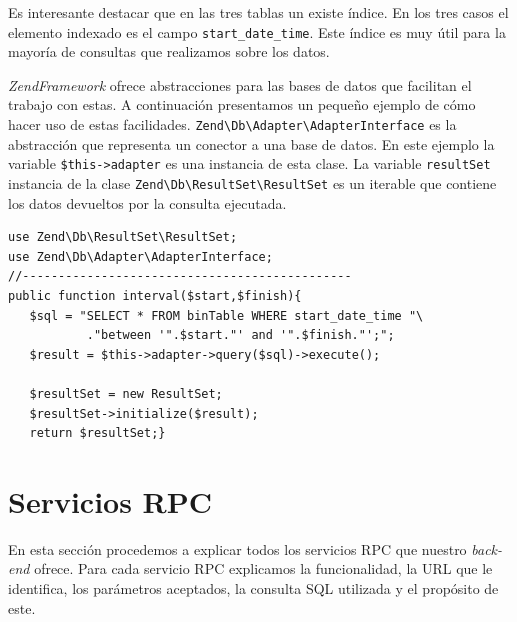	\par 
	Es interesante destacar que en las tres tablas un existe índice. En los tres casos el elemento indexado es el campo
	\texttt{start\_date\_time}. Este índice es muy útil para la mayoría de consultas que realizamos sobre los datos.
	\par
	\emph{ZendFramework} ofrece abstracciones para las bases de datos que facilitan el trabajo con estas. A continuación presentamos un pequeño ejemplo
	de cómo hacer uso de estas facilidades. \texttt{Zend\textbackslash Db\textbackslash Adapter\textbackslash AdapterInterface} es la abstracción
	que representa un conector a una base de datos. En este ejemplo la variable \texttt{\$this->adapter} es una instancia de esta clase. La
	variable \texttt{resultSet} instancia de la clase \texttt{Zend\textbackslash Db\textbackslash ResultSet\textbackslash ResultSet} es un
	iterable que contiene los datos devueltos por la consulta ejecutada.
	\begin{lstlisting}[style=myPhp]
use Zend\Db\ResultSet\ResultSet;
use Zend\Db\Adapter\AdapterInterface;
//----------------------------------------------
public function interval($start,$finish){
   $sql = "SELECT * FROM binTable WHERE start_date_time "\
           ."between '".$start."' and '".$finish."';";
   $result = $this->adapter->query($sql)->execute();

   $resultSet = new ResultSet;
   $resultSet->initialize($result);
   return $resultSet;}
	\end{lstlisting}
\section{Servicios RPC}
	En esta sección procedemos a explicar todos los servicios RPC que nuestro \emph{back-end} ofrece. Para cada servicio RPC explicamos la
	funcionalidad, la URL que le identifica, los parámetros aceptados, la consulta SQL utilizada y el propósito de este.
